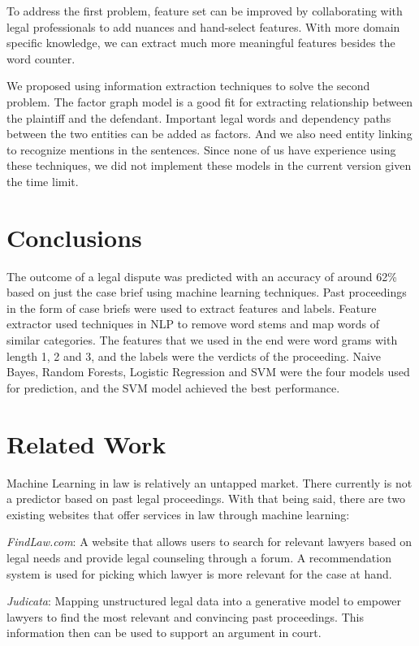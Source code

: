 \documentclass[journal]{IEEEtran}
\begin{document}
To address the first problem, feature set can be improved by collaborating with legal professionals to add nuances and hand-select features. With more domain specific knowledge, we can extract much more meaningful features besides the word counter.

We proposed using information extraction techniques to solve the second problem. The factor graph model is a good fit for extracting relationship between the plaintiff and the defendant. Important legal words and dependency paths between the two entities can be added as factors. And we also need entity linking to recognize mentions in the sentences. Since none of us have experience using these techniques, we did not implement these models in the current version given the time limit. 

\section{Conclusions}

The outcome of a legal dispute was predicted with an accuracy of around 62\% based on just the case brief using machine learning techniques. Past proceedings in the form of case briefs were used to extract features and labels. Feature extractor used techniques in NLP to remove word stems and map words of similar categories. The features that we used in the end were word grams with length 1, 2 and 3, and the labels were the verdicts of the proceeding. Naive Bayes, Random Forests, Logistic Regression and SVM were the four models used for prediction, and the SVM model achieved the best performance. 

\section{Related Work}

Machine Learning in law is relatively an untapped market. There currently is not a predictor based on past legal proceedings. With that being said, there are two existing websites that offer services in law through machine learning:

\textit{FindLaw.com}: A website that allows users to search for relevant lawyers based on legal needs and  provide legal counseling through a forum. A recommendation system is used for picking which lawyer is more relevant for the case at hand.

\textit{Judicata}: Mapping unstructured legal data into a generative model to empower lawyers to find the most relevant and convincing past proceedings. This information then can be used to support an argument in court.
\end{document}
